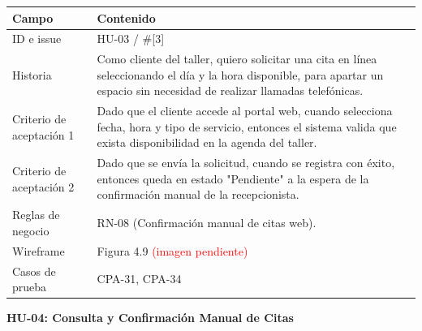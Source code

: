 {\def\LTcaptype{none} %
\begin{longtable}[]{@{}
  >{\raggedright\arraybackslash}p{}
  >{\raggedright\arraybackslash}p{}@{}}
\toprule\noalign{}
\begin{minipage}[b]{\linewidth}\raggedright
\textbf{Campo}
\end{minipage} & \begin{minipage}[b]{\linewidth}\raggedright
\textbf{Contenido}
\end{minipage} \\
\midrule\noalign{}
\endhead
\bottomrule\noalign{}
\endlastfoot
ID e issue & HU-03 / \#{[}3{]} \\
Historia & Como cliente del taller, quiero solicitar una cita en línea
seleccionando el día y la hora disponible, para apartar un espacio sin
necesidad de realizar llamadas telefónicas. \\
Criterio de aceptación 1 & Dado que el cliente accede al portal web,
cuando selecciona fecha, hora y tipo de servicio, entonces el sistema
valida que exista disponibilidad en la agenda del taller. \\
Criterio de aceptación 2 & Dado que se envía la solicitud, cuando se
registra con éxito, entonces queda en estado "Pendiente" a la espera de
la confirmación manual de la recepcionista. \\
Reglas de negocio & RN-08 (Confirmación manual de citas web). \\
Wireframe & Figura 4.9 \textcolor{red}{(imagen pendiente)} \\
Casos de prueba & CPA-31, CPA-34 \\
\end{longtable}
}

\textbf{HU-04: Consulta y Confirmación Manual de Citas}


